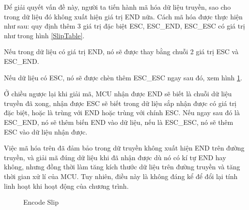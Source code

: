 Để giải quyết vấn đề này, người ta tiến hành mã hóa dữ liệu truyền, sao cho trong dữ liệu đó không xuất hiện giá trị END nữa. Cách mã hóa được thực hiện như sau: quy định thêm 3 giá trị đặc biệt ESC, ESC\_END, ESC\_ESC có giá trị như trong hình \ref{SlipTable}.

Nếu trong dữ liệu có giá trị END, nó sẽ được thay bằng chuỗi 2 giá trị ESC và ESC\_END. 

Nếu dữ liệu có ESC, nó sẽ được chèn thêm ESC\_ESC ngay sau đó, xem hình \ref{EncodeSlip}.

Ở chiều ngược lại khi giải mã, MCU nhận được END sẽ biết là chuỗi dữ liệu truyền đã xong, nhận được ESC sẽ biết trong dữ liệu sắp nhận được có giá trị đặc biệt, hoặc là trùng với END hoặc trùng với chính ESC. Nếu ngay sau đó là ESC\_END, nó sẽ thêm biến END vào dữ liệu, nếu là ESC\_ESC, nó sẽ thêm ESC vào dữ liệu nhận được.

 Việc mã hóa trên đã đảm bảo trong dữ truyền không xuất hiện END trên đường truyền, và giải mã đúng dữ liệu khi đã nhận được dù nó có kí tự END hay không, nhưng đồng thời làm tăng kích thước dữ liệu trên đường truyền và tăng thời gian xử lí của MCU. Tuy nhiên, điều này là không đáng kể để đổi lại tính linh hoạt khi hoạt động của chương trình.

\begin{figure}[h!]
    \centering
    \caption{Encode Slip}
    \label{EncodeSlip}
\end{figure}
